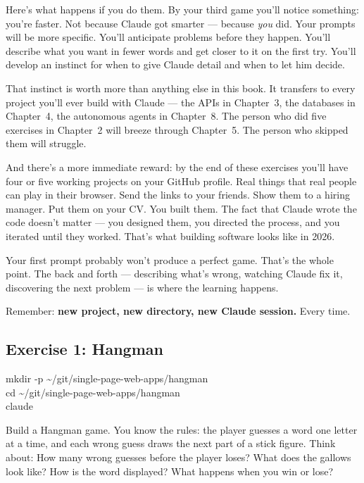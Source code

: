 \documentclass[11pt,a4paper]{article}
\begin{document}
Here's what happens if you do them. By your third game you'll notice something: you're faster. Not because Claude got smarter --- because \emph{you} did. Your prompts will be more specific. You'll anticipate problems before they happen. You'll describe what you want in fewer words and get closer to it on the first try. You'll develop an instinct for when to give Claude detail and when to let him decide.

That instinct is worth more than anything else in this book. It transfers to every project you'll ever build with Claude --- the APIs in Chapter~3, the databases in Chapter~4, the autonomous agents in Chapter~8. The person who did five exercises in Chapter~2 will breeze through Chapter~5. The person who skipped them will struggle.

And there's a more immediate reward: by the end of these exercises you'll have four or five working projects on your GitHub profile. Real things that real people can play in their browser. Send the links to your friends. Show them to a hiring manager. Put them on your CV. You built them. The fact that Claude wrote the code doesn't matter --- you designed them, you directed the process, and you iterated until they worked. That's what building software looks like in 2026.

Your first prompt probably won't produce a perfect game. That's the whole point. The back and forth --- describing what's wrong, watching Claude fix it, discovering the next problem --- is where the learning happens.

Remember: \textbf{new project, new directory, new Claude session.} Every time.

\subsection{Exercise 1: Hangman}

\begin{tcolorbox}[termbox]
mkdir -p \textasciitilde/git/single-page-web-apps/hangman\\
cd \textasciitilde/git/single-page-web-apps/hangman\\
claude
\end{tcolorbox}

Build a Hangman game. You know the rules: the player guesses a word one letter at a time, and each wrong guess draws the next part of a stick figure. Think about: How many wrong guesses before the player loses? What does the gallows look like? How is the word displayed? What happens when you win or lose?
\end{document}
